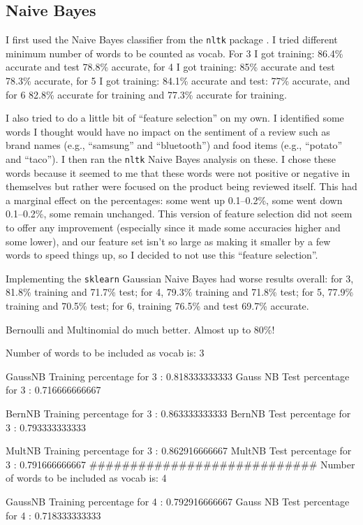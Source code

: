 \subsection{Naive Bayes}
I first used the Naive Bayes classifier from the \texttt{nltk} package \cite{bird2009}.  I tried different minimum number of words to be counted as vocab.  For 3 I got training: 86.4\% accurate and test 78.8\% accurate, for 4 I got training: 85\% accurate and test 78.3\% accurate, for 5 I got training: 84.1\% accurate and test: 77\% accurate, and for 6 82.8\% accurate for training and 77.3\% accurate for training.

I also tried to do a little bit of ``feature selection'' on my own.  I identified some words I thought would have no impact on the sentiment of a review such as brand names (e.g., ``samsung'' and ``bluetooth'') and food items (e.g., ``potato'' and ``taco'').  I then ran the \texttt{nltk} Naive Bayes analysis on these.  I chose these words because it seemed to me that these words were not positive or negative in themselves but rather were focused on the product being reviewed itself.  This had a marginal effect on the percentages: some went up 0.1--0.2\%, some went down 0.1--0.2\%, some remain unchanged.  This version of feature selection did not seem to offer any improvement (especially since it made some accuracies higher and some lower), and our feature set isn't so large as making it smaller by a few words to speed things up, so I decided to not use this ``feature selection''.

Implementing the \texttt{sklearn} \cite{zhu2009} Gaussian Naive Bayes had worse results overall: for 3, 81.8\% training and 71.7\% test; for 4, 79.3\% training and 71.8\% test; for 5, 77.9\% training and 70.5\% test; for 6, training 76.5\% and test 69.7\% accurate.

Bernoulli and Multinomial do much better.  Almost up to 80\%!

Number of words to be included as vocab is: 3

GaussNB Training percentage for 3 : 0.818333333333
Gauss NB Test percentage for 3 :     0.716666666667

BernNB Training percentage for 3 : 0.863333333333
BernNB Test percentage for 3 :     0.793333333333

MultNB Training percentage for 3 : 0.862916666667
MultNB Test percentage for 3 :     0.791666666667
############################
Number of words to be included as vocab is: 4

GaussNB Training percentage for 4 : 0.792916666667
Gauss NB Test percentage for 4 :     0.718333333333

